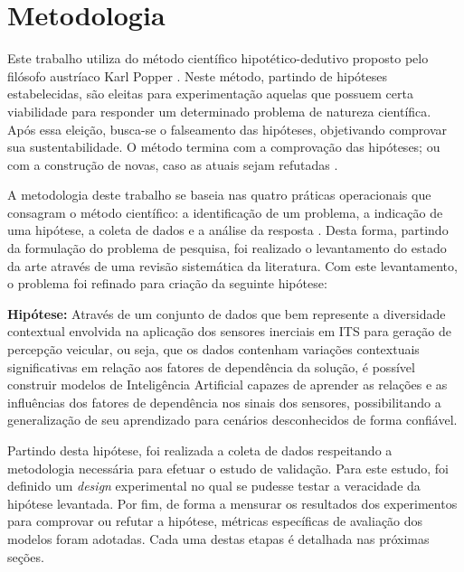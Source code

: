 \chapter{Metodologia}
\label{cap:metodologia}

Este trabalho utiliza do método científico hipotético-dedutivo proposto pelo filósofo austríaco Karl Popper \cite{Popper2002}. Neste método, partindo de hipóteses estabelecidas, são eleitas para experimentação aquelas que possuem certa viabilidade para responder um determinado problema de natureza científica. Após essa eleição, busca-se o falseamento das hipóteses, objetivando comprovar sua sustentabilidade. O método termina com a comprovação das hipóteses; ou com a construção de novas, caso as atuais sejam refutadas \cite{Bonat2009}.

A metodologia deste trabalho se baseia nas quatro práticas operacionais que consagram o método científico: a identificação de um problema, a indicação de uma hipótese, a coleta de dados e a análise da resposta \cite{Bonat2009}. Desta forma, partindo da formulação do problema de pesquisa, foi realizado o levantamento do estado da arte através de uma revisão sistemática da literatura. Com este levantamento, o problema foi refinado para criação da seguinte hipótese: 

\begin{description}
\item{\textbf{Hipótese:}} Através de um conjunto de dados que bem represente a diversidade contextual envolvida na aplicação dos sensores inerciais em ITS para geração de percepção veicular, ou seja, que os dados contenham variações contextuais significativas em relação aos fatores de dependência da solução, é possível construir modelos de Inteligência Artificial capazes de aprender as relações e as influências dos fatores de dependência nos sinais dos sensores, possibilitando a generalização de seu aprendizado para cenários desconhecidos de forma confiável.
\end{description}

Partindo desta hipótese, foi realizada a coleta de dados respeitando a metodologia necessária para efetuar o estudo de validação. Para este estudo, foi definido um \textit{design} experimental no qual se pudesse testar a veracidade da hipótese levantada. Por fim, de forma a mensurar os resultados dos experimentos para comprovar ou refutar a hipótese, métricas específicas de avaliação dos modelos foram adotadas. Cada uma destas etapas é detalhada nas próximas seções.

